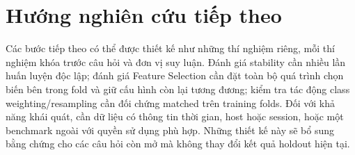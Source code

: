 \section{Hướng nghiên cứu tiếp theo}

Các bước tiếp theo có thể được thiết kế như những thí nghiệm riêng, mỗi thí nghiệm khóa trước câu hỏi và đơn vị suy luận. Đánh giá stability cần nhiều lần huấn luyện độc lập; đánh giá Feature Selection cần đặt toàn bộ quá trình chọn biến bên trong fold và giữ cấu hình còn lại tương đương; kiểm tra tác động class weighting/resampling cần đối chứng matched trên training folds. Đối với khả năng khái quát, cần dữ liệu có thông tin thời gian, host hoặc session, hoặc một benchmark ngoài với quyền sử dụng phù hợp. Những thiết kế này sẽ bổ sung bằng chứng cho các câu hỏi còn mở mà không thay đổi kết quả holdout hiện tại.
